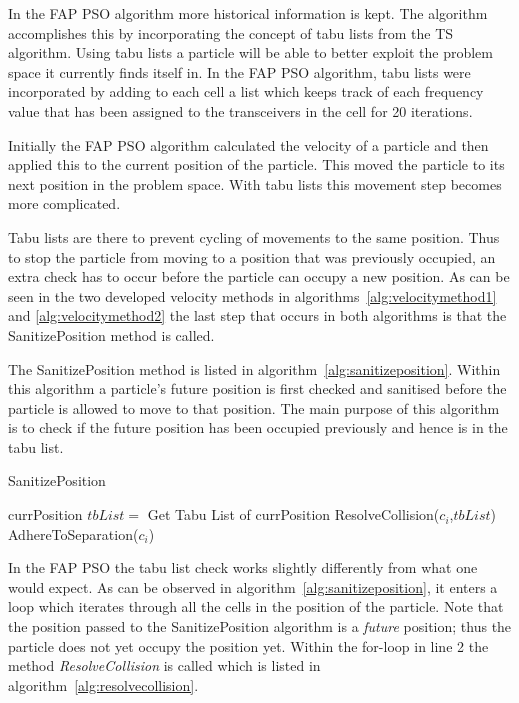 In the \gls{FAP} \gls{PSO} algorithm more historical information is kept. The algorithm accomplishes this by incorporating the concept of tabu lists from the \gls{TS} algorithm. Using tabu lists a particle will be able to better exploit the problem space it currently finds itself in. In the \gls{FAP} \gls{PSO} algorithm, tabu lists were incorporated by adding to each cell a list which keeps track of each frequency value that has been assigned to the transceivers in the cell for 20 iterations.

Initially the \gls{FAP} \gls{PSO} algorithm calculated the velocity of a particle and then applied this to the current position of the particle. This moved the particle to its next position in the problem space. With tabu lists this movement step becomes more complicated.

Tabu lists are there to prevent cycling of movements to the same position. Thus to stop the particle from moving to a position that was previously occupied, an extra check has to occur before the particle can occupy a new position. As can be seen in the two developed velocity methods in algorithms~\ref{alg:velocitymethod1} and \ref{alg:velocitymethod2} the last step that occurs in both algorithms is that the SanitizePosition method is called.


The SanitizePosition method is listed in algorithm~\ref{alg:sanitizeposition}. Within this algorithm a particle's future position is first checked and sanitised before the particle is allowed to move to that position. The main purpose of this algorithm is to check if the future position has been occupied previously and hence is in the tabu list.
\begin{algorithm}[H]
\caption{SanitizePosition}
\label{alg:sanitizeposition}
\begin{algorithmic}[1]
	\Require currPosition
		\State $tbList = $ Get Tabu List of currPosition
		\State ResolveCollision($c_i$,$tbList$)
		\State AdhereToSeparation($c_i$)
	\EndFor
\end{algorithmic}
\end{algorithm}


In the \gls{FAP} \gls{PSO} the tabu list check works slightly differently from what one would expect. As can be observed in algorithm~\ref{alg:sanitizeposition}, it enters a loop which iterates through all the cells in the position of the particle. Note that the position passed to the SanitizePosition algorithm is a \emph{future} position; thus the particle does not yet occupy the position yet. Within the for-loop in line 2 the method \emph{ResolveCollision} is called which is listed in algorithm~\ref{alg:resolvecollision}.

